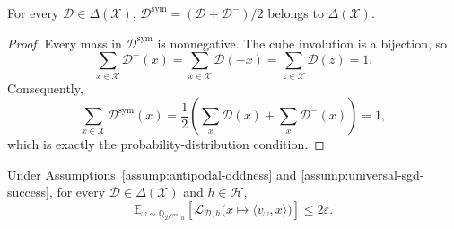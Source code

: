 \begin{lemma}
\label{lem:step-003-sym-law}
For every $\mathcal D\in\Delta(\mathcal X)$,
$\mathcal D^{\mathrm{sym}}=(\mathcal D+\mathcal D^-)/2$ belongs to
$\Delta(\mathcal X)$.
\end{lemma}

\begin{proof}
Every mass in $\mathcal D^{\mathrm{sym}}$ is nonnegative.  The cube
involution is a bijection, so
\[
\sum_{x\in\mathcal X}\mathcal D^-(x)
=\sum_{x\in\mathcal X}\mathcal D(-x)
=\sum_{z\in\mathcal X}\mathcal D(z)=1.
\]
Consequently,
\[
\sum_{x\in\mathcal X}\mathcal D^{\mathrm{sym}}(x)
=\frac12\left(\sum_x\mathcal D(x)+\sum_x\mathcal D^-(x)\right)=1,
\]
which is exactly the probability-distribution condition.
\end{proof}

\begin{proposition}
\label{prop:step-003-expected-transfer}
Under Assumptions~\ref{assump:antipodal-oddness} and
\ref{assump:universal-sgd-success}, for every
$\mathcal D\in\Delta(\mathcal X)$ and $h\in\mathcal H$,
\[
\mathbb E_{\omega\sim\mathbb Q_{\mathcal D^{\mathrm{sym}},h}}
 \left[\mathcal L_{\mathcal D,h}
 \bigl(x\mapsto\langle v_\omega,x\rangle\bigr)\right]
\leq2\varepsilon.
\]
\end{proposition}

